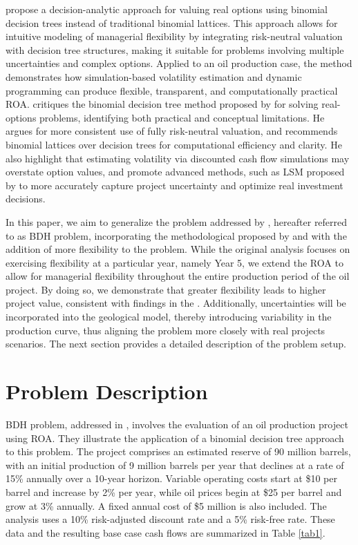 \documentclass[pdflatex,sn-basic]{sn-jnl}%
\theoremstyle{thmstyleone}%
\theoremstyle{thmstyletwo}%
\theoremstyle{thmstylethree}%
\begin{document}
\cite{ref12a} propose a decision-analytic approach for valuing real options using binomial decision trees instead of traditional binomial lattices. This approach allows for intuitive modeling of managerial flexibility by integrating risk-neutral valuation with decision tree structures, making it suitable for problems involving multiple uncertainties and complex options. Applied to an oil production case, the method demonstrates how simulation-based volatility estimation and dynamic programming can produce flexible, transparent, and computationally practical ROA. \cite{ref13} critiques the binomial decision tree method proposed by \cite{ref12a} for solving real-options problems, identifying both practical and conceptual limitations. He argues for more consistent use of fully risk-neutral valuation, and recommends binomial lattices over decision trees for computational efficiency and clarity. He also highlight that estimating volatility via discounted cash flow simulations may overstate option values, and promote advanced methods, such as LSM proposed by \cite{ref14} to more accurately capture project uncertainty and optimize real investment decisions.

In this paper, we aim to generalize the problem addressed by \cite{ref12a}, hereafter referred to as BDH problem, incorporating the methodological proposed by \cite{ref13} and with the addition of more flexibility to the problem. While the original analysis focuses on exercising flexibility at a particular year, namely Year 5, we extend the ROA to allow for managerial flexibility throughout the entire production period of the oil project. By doing so, we demonstrate that greater flexibility leads to higher project value, consistent with findings in the \cite{ref9}. Additionally, uncertainties will be incorporated into the geological model, thereby introducing variability in the production curve, thus aligning the problem more closely with real projects scenarios. The next section provides a detailed description of the problem setup.

\section{Problem Description}\label{sec23}

BDH problem, addressed in \cite{ref12a}, involves the evaluation of an oil production project using ROA. They illustrate the application of a binomial decision tree approach to this problem. The project comprises an estimated reserve of 90 million barrels, with an initial production of 9 million barrels per year that declines at a rate of 15\% annually over a 10-year horizon. Variable operating costs start at \$10 per barrel and increase by 2\% per year, while oil prices begin at \$25 per barrel and grow at 3\% annually. A fixed annual cost of \$5 million is also included. The analysis uses a 10\% risk-adjusted discount rate and a 5\% risk-free rate. These data and the resulting base case cash flows are summarized in Table \ref{tab1}.
\end{document}
